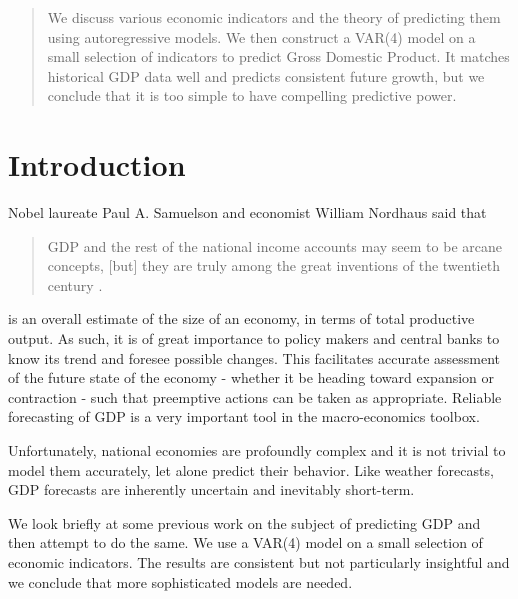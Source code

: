 \begin{abstract}
    We discuss various economic indicators and the theory of predicting them
    using autoregressive models.  We then construct a VAR(4) model on a 
    small selection of indicators to predict Gross Domestic Product.  
    It matches historical GDP data well and predicts consistent future growth,
    but we conclude that it is too simple to have compelling predictive power.
\end{abstract}

\section{Introduction}
    Nobel laureate Paul A. Samuelson and economist William Nordhaus said that
    \begin{quote} 
        GDP and the rest of the national income accounts may seem to be arcane 
        concepts, [but] they are truly among the great inventions of the 
        twentieth century \cite{samuelson}.
    \end{quote}
    
     is an overall estimate of the size of an 
    economy, in terms of total productive output. As such, it is of great 
    importance to policy makers and central banks to know its trend and foresee 
    possible changes.  This facilitates accurate assessment of the future state 
    of the economy - whether it be heading toward expansion or contraction - 
    such that preemptive actions can be taken as appropriate. Reliable 
    forecasting of GDP is a very important tool in the macro-economics toolbox.

    Unfortunately, national economies are profoundly complex and it is not 
    trivial to model them accurately, let alone predict their behavior. Like 
    weather forecasts, GDP forecasts are inherently uncertain and 
    inevitably short-term.

    We look briefly at some previous work on the subject of predicting GDP and 
    then attempt to do the same.  We use a VAR(4) model on a small selection of 
    economic indicators.  The results are consistent but not particularly 
    insightful and we conclude that more sophisticated models are needed.